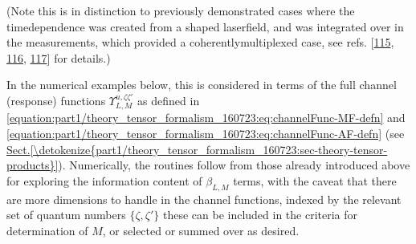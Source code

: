 \documentclass[letterpaper,table,10pt,english]{jupyterBook}
\begin{document}
\sphinxAtStartPar
(Note this is in
distinction to previously demonstrated cases where the time\sphinxhyphen{}dependence
was created from a shaped laser\sphinxhyphen{}field, and was integrated over in the
measurements, which provided a coherently\sphinxhyphen{}multiplexed case, see refs.
{[}\hyperlink{cite.backmatter/bibliography:id650}{115}, \hyperlink{cite.backmatter/bibliography:id652}{116}, \hyperlink{cite.backmatter/bibliography:id651}{117}{]} for details.)

\sphinxAtStartPar
In the numerical examples below, this is considered in terms of the full channel (response) functions \(\varUpsilon_{L,M}^{u,\zeta\zeta'}\) as defined in \eqref{equation:part1/theory_tensor_formalism_160723:eq:channelFunc-MF-defn} and \eqref{equation:part1/theory_tensor_formalism_160723:eq:channelFunc-AF-defn} (see \hyperref[\detokenize{part1/theory_tensor_formalism_160723:sec-theory-tensor-products}]{Sect.\@ \ref{\detokenize{part1/theory_tensor_formalism_160723:sec-theory-tensor-products}}}). Numerically, the routines follow from those already introduced above for exploring the information content of \(\beta_{L,M}\) terms, with the caveat that there are more dimensions to handle in the channel functions, indexed by the relevant set of quantum numbers \(\{\zeta,\zeta'\}\) \sphinxhyphen{} these can be included in the criteria for determination of \(M\), or selected or summed over as desired.
\end{document}
